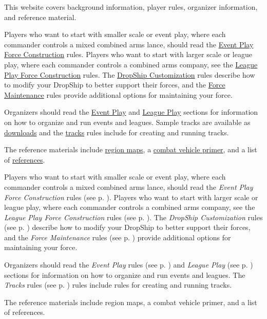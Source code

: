  {
This website covers background information, player rules, organizer information, and reference material.

Players who want to start with smaller scale or event play, where each commander controls a mixed combined arms lance, should read the \hyperref[subsec:force_construction_scale_1]{Event Play Force Construction} rules.
Players who want to start with larger scale or league play, where each commander controls a combined arms company, see the \hyperref[subsec:force_construction_scale_2]{League Play Force Construction} rules.
The \hyperref[sec:dropship_customization]{DropShip Customization} rules describe how to modify your DropShip to better support their forces, and the \hyperref[sec:force_maintenance]{Force Maintenance} rules provide additional options for maintaining your force.

Organizers should read the \hyperref[sec:event_play]{Event Play} and \hyperref[sec:league_play]{League Play} sections for information on how to organize and run events and leagues.
Sample tracks are available as \hyperref[sec:downloads]{downloads} and the \hyperref[sec:tracks]{tracks} rules include  for creating and running tracks.

The reference materials include \hyperref[sec:outworlds_wastes_map]{region maps}, a \hyperref[sec:combat_vehicle_primer]{combat vehicle primer}, and a list of \hyperref[sec:references]{references}.
} {
Players who want to start with smaller scale or event play, where each commander controls a mixed combined arms lance, should read the \emph{Event Play Force Construction} rules (see p. \pageref{subsec:force_construction_scale_1}).
Players who want to start with larger scale or league play, where each commander controls a combined arms company, see the \emph{League Play Force Construction} rules (see p. \pageref{subsec:force_construction_scale_2}).
The \emph{DropShip Customization} rules (see p. \pageref{sec:dropship_customization}) describe how to modify your DropShip to better support their forces, and the \emph{Force Maintenance} rules (see p. \pageref{sec:force_maintenance}) provide additional options for maintaining your force.

Organizers should read the \emph{Event Play} rules (see p. \pageref{sec:event_play}) and \emph{League Play} (see p. \pageref{sec:league_play}) sections for information on how to organize and run events and leagues.
The \emph{Tracks} rules (see p. \pageref{sec:tracks}) rules include rules for creating and running tracks.

The reference materials include region maps, a combat vehicle primer, and a list of references.
}
